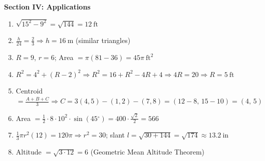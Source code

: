 \documentclass[12pt,addpoints]{exam}
\newcommand{\deg}{{}^\circ}
\begin{document}
\vspace{0.3cm}
\noindent\textbf{Section IV: Applications}
\begin{enumerate}[label=\arabic*.]
  \item[31.] $\sqrt{15^2 - 9^2} = \sqrt{144} = \boxed{12~\text{ft}}$
  \item[32.] $\frac{h}{24} = \frac{2}{3} \Rightarrow h = \boxed{16~\text{m}}$ (similar triangles)
  \item[33.] $R = 9$, $r = 6$; Area $= \pi(81 - 36) = \boxed{45\pi~\text{ft}^2}$
  \item[34.] $R^2 = 4^2 + (R-2)^2 \Rightarrow R^2 = 16 + R^2 - 4R + 4 \Rightarrow 4R = 20 \Rightarrow \boxed{R = 5~\text{ft}}$
  \item[35.] Centroid $= \frac{A+B+C}{3} \Rightarrow C = 3(4,5) - (1,2) - (7,8) = (12-8,\, 15-10) = \boxed{(4,\, 5)}$
  \item[36.] Area $= \frac{1}{2} \cdot 8 \cdot 10^2 \cdot \sin(45\deg) = 400 \cdot \frac{\sqrt{2}}{2} = \boxed{566}$
  \item[37.] $\frac{1}{3}\pi r^2(12) = 120\pi \Rightarrow r^2 = 30$; slant $l = \sqrt{30+144} = \boxed{\sqrt{174} \approx 13.2~\text{in}}$
  \item[38.] Altitude $= \sqrt{3 \cdot 12} = \boxed{6}$ (Geometric Mean Altitude Theorem)
\end{enumerate}
\end{document}
